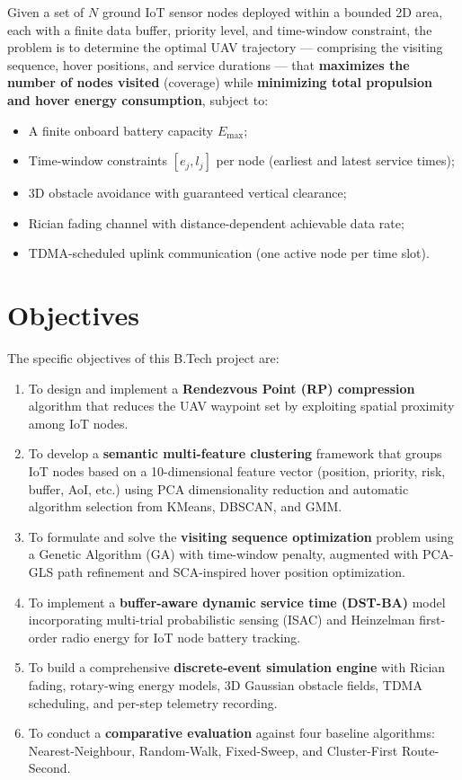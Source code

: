\documentclass[12pt, a4paper, oneside]{report}
\begin{document}
Given a set of $N$ ground IoT sensor nodes deployed within a bounded 2D area, each with a finite data buffer, priority level, and time-window constraint, the problem is to determine the optimal UAV trajectory --- comprising the visiting sequence, hover positions, and service durations --- that \textbf{maximizes the number of nodes visited} (coverage) while \textbf{minimizing total propulsion and hover energy consumption}, subject to:
\begin{itemize}
    \item A finite onboard battery capacity $E_{\max}$;
    \item Time-window constraints $[e_j, l_j]$ per node (earliest and latest service times);
    \item 3D obstacle avoidance with guaranteed vertical clearance;
    \item Rician fading channel with distance-dependent achievable data rate;
    \item TDMA-scheduled uplink communication (one active node per time slot).
\end{itemize}

\section{Objectives}

The specific objectives of this B.Tech project are:

\begin{enumerate}
    \item To design and implement a \textbf{Rendezvous Point (RP) compression} algorithm that reduces the UAV waypoint set by exploiting spatial proximity among IoT nodes.

    \item To develop a \textbf{semantic multi-feature clustering} framework that groups IoT nodes based on a 10-dimensional feature vector (position, priority, risk, buffer, AoI, etc.) using PCA dimensionality reduction and automatic algorithm selection from KMeans, DBSCAN, and GMM.

    \item To formulate and solve the \textbf{visiting sequence optimization} problem using a Genetic Algorithm (GA) with time-window penalty, augmented with PCA-GLS path refinement and SCA-inspired hover position optimization.

    \item To implement a \textbf{buffer-aware dynamic service time (DST-BA)} model incorporating multi-trial probabilistic sensing (ISAC) and Heinzelman first-order radio energy for IoT node battery tracking.

    \item To build a comprehensive \textbf{discrete-event simulation engine} with Rician fading, rotary-wing energy models, 3D Gaussian obstacle fields, TDMA scheduling, and per-step telemetry recording.

    \item To conduct a \textbf{comparative evaluation} against four baseline algorithms: Nearest-Neighbour, Random-Walk, Fixed-Sweep, and Cluster-First Route-Second.
\end{enumerate}
\end{document}
